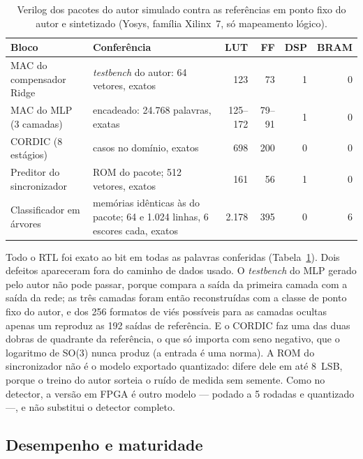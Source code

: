 \documentclass[12pt]{article}
\begin{document}
\begin{table}[ht]
\centering
\caption{Verilog dos pacotes do autor simulado contra as referências em ponto
fixo do autor e sintetizado (Yosys, família Xilinx~7, só mapeamento lógico).}
\label{tab:rtl}
\scriptsize
\begin{tabular}{>{\raggedright\arraybackslash}p{3.4cm}>{\raggedright\arraybackslash}p{5.4cm}rrrr}
\toprule
Bloco & Conferência & LUT & FF & DSP & BRAM \\
\midrule
MAC do compensador Ridge & \textit{testbench} do autor: 64 vetores, exatos & 123 & 73 & 1 & 0 \\
MAC do MLP (3 camadas) & encadeado: 24.768 palavras, exatas & 125--172 & 79--91 & 1 & 0 \\
CORDIC (8 estágios) & 6.006 casos no domínio, exatos & 698 & 200 & 0 & 0 \\
Preditor do sincronizador & ROM do pacote; 512 vetores, exatos & 161 & 56 & 1 & 0 \\
Classificador em árvores & memórias idênticas às do pacote; 64 e 1.024 linhas, 6 escores cada, exatos & 2.178 & 395 & 0 & 6 \\
\bottomrule
\end{tabular}
\end{table}

Todo o RTL foi exato ao bit em todas as palavras conferidas
(Tabela~\ref{tab:rtl}). Dois defeitos apareceram fora do caminho de dados usado.
O \textit{testbench} do MLP gerado pelo autor não pode passar, porque compara a
saída da primeira camada com a saída da rede; as três camadas foram então
reconstruídas com a classe de ponto fixo do autor, e dos 256 formatos de viés
possíveis para as camadas ocultas apenas um reproduz as 192 saídas de referência.
E o CORDIC faz uma das duas dobras de quadrante da referência, o que só importa
com seno negativo, que o logaritmo de SO(3) nunca produz (a entrada é uma norma).
A ROM do sincronizador não é o modelo exportado quantizado: difere dele em até
8~LSB, porque o treino do autor sorteia o ruído de medida sem semente. Como no
detector, a versão em FPGA é outro modelo --- podado a 5 rodadas e quantizado ---,
e não substitui o detector completo.

\subsection{Desempenho e maturidade}
\label{sec:desempenho}
\end{document}
